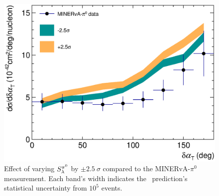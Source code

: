 \begin{enumerate}
        \begin{figure}[!htb]
            \centering
            \includegraphics[width=\sgfigwid\textwidth]{figures/tuning/minerva_pi0_dalphat_FSI_pi0mfp.eps}
            \caption{Effect of varying $S_\lambda^{\pi^{0}}$ by $\pm2.5~\sigma$ compared to the MINERvA-$\pi^0$ measurement. Each band's width indicates the \genie\ prediction's statistical uncertainty from $10^5$ events.}
            \label{fig:minpiz-pn-pi0mfp}
        \end{figure}


\end{enumerate}

